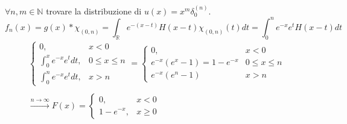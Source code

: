 $\forall n,m\in \mathbb{N}$ trovare la distribuzione di $u( x) =x^{m} \delta ^{( n)}_{0}$.
\Soluzione
\begin{equation*}
f_{n} (x)=g(x)*\chi _{(0,n)} =\int _{\mathbb{R}} e^{-(x-t)} H(x-t)\chi _{(0,n)} (t)dt=\int ^{n}_{0} e^{-x} e^{t} H(x-t)dt
\end{equation*}
\begin{gather*}
\begin{cases}
0, & x< 0\\
\int ^{x}_{0} e^{-x} e^{t} dt, & 0\leqslant x\leqslant n\\
\int ^{n}_{0} e^{-x} e^{t} dt, & x >n
\end{cases} =\begin{cases}
0, & x< 0\\
e^{-x}\left( e^{x} -1\right) =1-e^{-x} & 0\leqslant x\leqslant n\\
e^{-x} (e^{n} -1) & x >n
\end{cases}\\
\\
\xrightarrow{n\rightarrow \infty } F( x) =\begin{cases}
0, & x< 0\\
1-e^{-x} , & x\geqslant 0
\end{cases}
\end{gather*}
